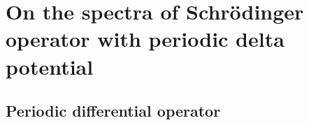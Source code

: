 \documentclass[fontsize=14pt,a4paper,DIV=1]{scrartcl}
\numberwithin{equation}{section}
\begin{document}
\pagestyle{headings}

\section{On the spectra of Schrödinger operator with periodic delta potential}

\subsection{Periodic differential operator}

 



	

	
\newpage
\end{document}
